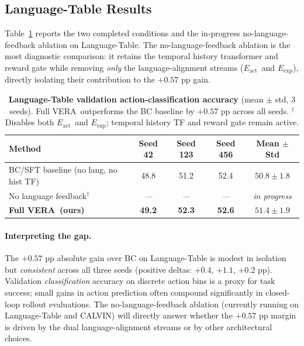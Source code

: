 \documentclass{article}
\newcommand{\modelname}{\textsc{VERA}\xspace}
\newcommand{\Lact}{$E_{\mathrm{act}}$\xspace}
\newcommand{\Lexp}{$E_{\mathrm{exp}}$\xspace}
\newcommand{\tbd}{\textit{---}\xspace}
\begin{document}
\subsection{Language-Table Results}
\label{sec:lt_results}

Table~\ref{tab:lt_results} reports the two completed conditions and the
in-progress no-language-feedback ablation on Language-Table.
The no-language-feedback ablation is the most diagnostic comparison:
it retains the temporal history transformer and reward gate while removing
\emph{only} the language-alignment streams (\Lact\ and \Lexp), directly
isolating their contribution to the $+0.57$ pp gain.

\begin{table}[t]
\centering
\caption{
  \textbf{Language-Table validation action-classification accuracy}
  (mean $\pm$ std, 3 seeds).
  Full \modelname\ outperforms the BC baseline by $+0.57$ pp across all seeds.
  $^\dagger$Disables both \Lact\ and \Lexp; temporal history TF and reward gate remain active.
}
\label{tab:lt_results}
\small
\setlength{\tabcolsep}{5pt}
\begin{tabular}{lcccc}
\toprule
\textbf{Method} & \textbf{Seed 42} & \textbf{Seed 123} & \textbf{Seed 456}
                & \textbf{Mean $\pm$ Std} \\
\midrule
BC/SFT baseline (no lang, no hist TF)
  & 48.8 & 51.2 & 52.4 & $50.8 \pm 1.8$ \\
No language feedback$^\dagger$
  & \tbd & \tbd & \tbd & \textit{in progress} \\
\midrule
\textbf{Full \modelname\ (ours)}
  & \textbf{49.2} & \textbf{52.3} & \textbf{52.6} & $\mathbf{51.4 \pm 1.9}$ \\
\bottomrule
\end{tabular}
\end{table}

\paragraph{Interpreting the gap.}
The $+0.57$ pp absolute gain over BC on Language-Table
is modest in isolation but \emph{consistent} across all three seeds
(positive deltas: $+0.4$, $+1.1$, $+0.2$ pp).
Validation \emph{classification} accuracy on discrete action bins is a proxy
for task success; small gains in action prediction often compound significantly
in closed-loop rollout evaluations.
The no-language-feedback ablation (currently running on Language-Table and CALVIN)
will directly answer whether the $+0.57$ pp margin is driven by the dual
language-alignment streams or by other architectural choices.
\end{document}
